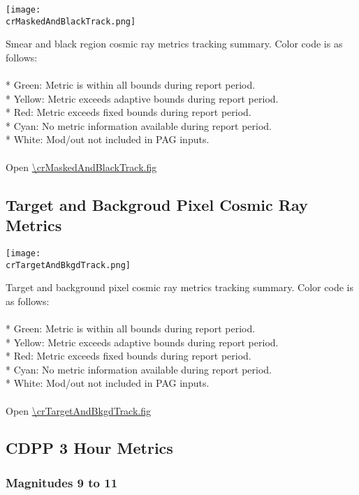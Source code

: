 \begin{center}
\texttt{[image: \\crMaskedAndBlackTrack.png]}
\end{center}
Smear and black region cosmic ray metrics tracking summary. Color code is as follows:\\
\\
* Green: Metric is within all bounds during report period.\\
* Yellow: Metric exceeds adaptive bounds during report period.\\
* Red: Metric exceeds fixed bounds during report period.\\
* Cyan: No metric information available during report period.\\
* White: Mod/out not included in PAG inputs.\\
\\
Open \url{\crMaskedAndBlackTrack.fig}

\newpage

\subsection{Target and Backgroud Pixel Cosmic Ray Metrics}

\begin{center}
\texttt{[image: \\crTargetAndBkgdTrack.png]}
\end{center}
Target and background pixel cosmic ray metrics tracking summary. Color code is as follows:\\
\\
* Green: Metric is within all bounds during report period.\\
* Yellow: Metric exceeds adaptive bounds during report period.\\
* Red: Metric exceeds fixed bounds during report period.\\
* Cyan: No metric information available during report period.\\
* White: Mod/out not included in PAG inputs.\\
\\
Open \url{\crTargetAndBkgdTrack.fig}

\newpage

\subsection{CDPP 3 Hour Metrics}

\subsubsection{Magnitudes 9 to 11}


